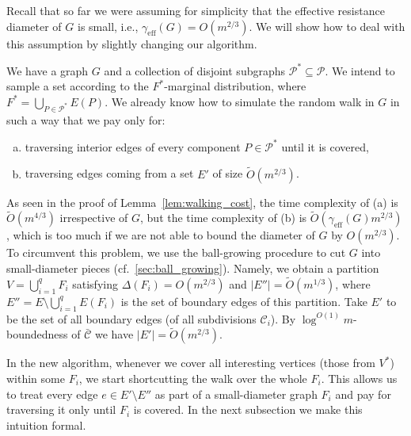 \documentclass[11pt, letterpaper]{article}
\newcommand{\cC}{\mathcal{C}}
\newcommand{\ocC}{\bar{\mathcal{C}}}
\newcommand{\cP}{\mathcal{P}}
\newcommand{\tO}{\widetilde{O}}
\newcommand{\diameff}{\gamma_{\mathrm{eff}}}
\newcommand{\diamdist}{\Delta}
\begin{document}
Recall that so far we were assuming for simplicity that the effective resistance diameter of $G$ is small, i.e.,  $\diameff(G)=O(m^{2/3})$. We will show how to deal with this assumption by slightly changing our algorithm. 

We have a graph $G$ and a collection of disjoint subgraphs $\cP^* \subseteq \cP$. We intend to sample a set according to the $F^*$-marginal distribution, where $F^*=\bigcup_{P\in \cP^*}E(P)$. 
We already know how to simulate the random walk in $G$ in such a way that we pay only for:
\begin{enumerate}[(a)]
\item traversing interior edges of every component $P\in \cP^*$ until it is covered,
\item traversing edges coming from a set $E'$ of size $\tO(m^{2/3})$.
\end{enumerate}
As seen in the proof of Lemma~\ref{lem:walking_cost}, the time complexity of (a) is $\tO(m^{4/3})$ irrespective of $G$, but the time complexity of (b) is $\tO(\diameff(G)m^{2/3})$, which is too much if we are not able to bound the diameter of $G$ by $O(m^{2/3})$. To circumvent this problem, we use the ball-growing procedure to cut $G$ into small-diameter pieces (cf.~\ref{sec:ball_growing}). Namely, we obtain a partition $V=\bigcup_{i=1}^{q} F_i$ satisfying $\diamdist(F_i)=O(m^{2/3})$ and $|E''|=\tO(m^{1/3})$, where $E''=E\setminus \bigcup_{i=1}^{q} E(F_i)$ is the set of boundary edges of this partition. Take $E'$ to be the set of all boundary edges (of all subdivisions $\cC_i$). By $\log^{O(1)}m$-boundedness of $\ocC$ we have $|E'| = \tO(m^{2/3})$.

In the new algorithm, whenever we cover all interesting vertices (those from $V^*$) within some $F_i$, we start shortcutting the walk over the whole $F_i$. This allows us to treat every edge $e\in E'\setminus E''$ as part of a small-diameter graph $F_i$ and pay for traversing it only until $F_i$ is covered. In the next subsection we make this intuition formal.
\end{document}
